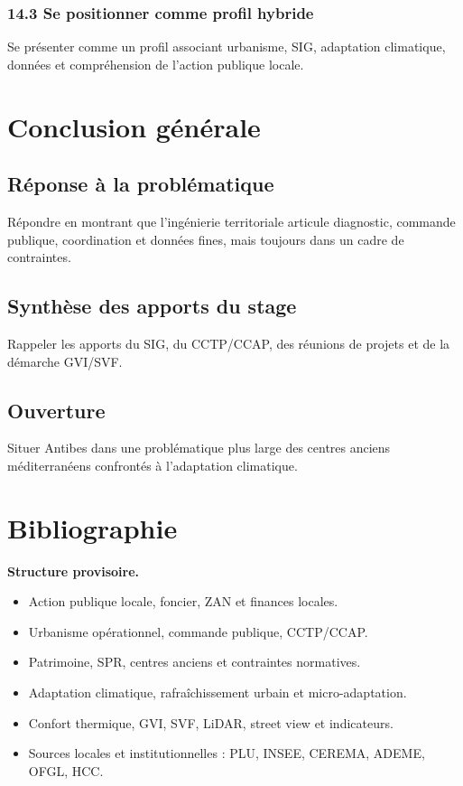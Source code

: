 \documentclass[11pt,a4paper]{article}
\begin{document}
\subsubsection{14.3 Se positionner comme profil hybride}
Se présenter comme un profil associant urbanisme, SIG, adaptation climatique, données et compréhension de l'action publique locale.

\section{Conclusion générale}

\subsection{Réponse à la problématique}
Répondre en montrant que l'ingénierie territoriale articule diagnostic, commande publique, coordination et données fines, mais toujours dans un cadre de contraintes.

\subsection{Synthèse des apports du stage}
Rappeler les apports du SIG, du CCTP/CCAP, des réunions de projets et de la démarche GVI/SVF.

\subsection{Ouverture}
Situer Antibes dans une problématique plus large des centres anciens méditerranéens confrontés à l'adaptation climatique.

\section{Bibliographie}

\textbf{Structure provisoire.}
\begin{itemize}
  \item Action publique locale, foncier, ZAN et finances locales.
  \item Urbanisme opérationnel, commande publique, CCTP/CCAP.
  \item Patrimoine, SPR, centres anciens et contraintes normatives.
  \item Adaptation climatique, rafraîchissement urbain et micro-adaptation.
  \item Confort thermique, GVI, SVF, LiDAR, street view et indicateurs.
  \item Sources locales et institutionnelles : PLU, INSEE, CEREMA, ADEME, OFGL, HCC.
\end{itemize}
\end{document}
